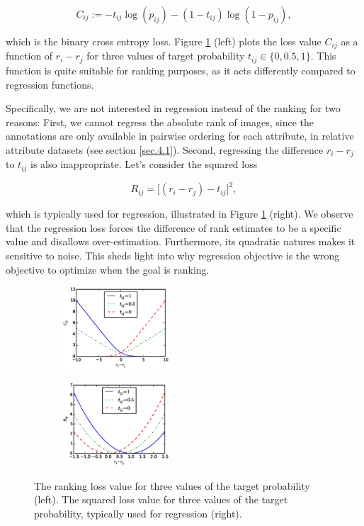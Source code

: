 \begin{equation}
C_{ij} := - t_{ij} \log (p_{ij}) - (1 - t_{ij}) \log (1 - p_{ij}),
\end{equation}

which is the binary cross entropy loss.
Figure \ref{fig.2} (left) plots the loss value $C_{ij}$ as a function of $r_i - r_j$ for three values of target probability $t_{ij} \in \{0, 0.5, 1\}$. This function is quite suitable for ranking purposes, as it acts differently compared to regression functions.

Specifically, we are not interested in regression instead of the ranking for two reasons: First, we cannot regress the absolute rank of images, since the annotations are only available in pairwise ordering for each attribute, in relative attribute datasets (see section \ref{sec.4.1}). Second, regressing the difference $r_i - r_j$ to $t_{ij}$ is also inappropriate.
Let's consider the squared loss

\begin{equation}
R_{ij} = \big[(r_i - r_j) - t_{ij}\big]^2,
\end{equation}

which is typically used for regression, illustrated in Figure \ref{fig.2} (right). We observe that the regression loss forces the difference of rank estimates to be a specific value and disallows over-estimation. Furthermore, its quadratic natures makes it %
sensitive to noise. This sheds light into why regression objective is the wrong objective to optimize when the goal is ranking.

\begin{figure}
    \centering
    \begin{subfigure}
        \centering
        \includegraphics[width=4cm]{fig2-2/fig3.eps}
    \end{subfigure}
    \begin{subfigure}
        \centering
        \includegraphics[width=4cm]{fig2-2/fig3-reg.eps}
    \end{subfigure}
    \caption{The ranking loss value for three values of the target probability (left). The squared loss value for three values of the target probability, typically used for regression (right).}
    \label{fig.2}
\end{figure}

